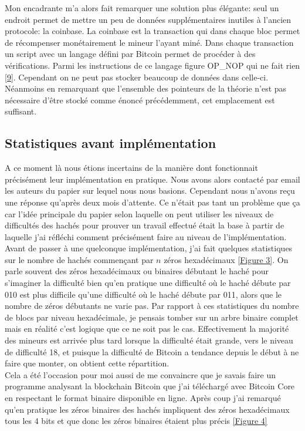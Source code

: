 \documentclass[12pt,a4paper]{article}
\newcommand{\source}[1]{\hyperlink{#1}{[#1]}}
\newcommand{\annexe}[2]{\hyperlink{#1}{[Figure #2]}}
\begin{document}
	Mon encadrante m'a alors fait remarquer une solution plus élégante: seul un endroit permet de mettre un peu de données supplémentaires inutiles à l'ancien protocole: la coinbase. La coinbase est la transaction qui dans chaque bloc permet de récompenser monétairement le mineur l'ayant miné. Dans chaque transaction un script avec un langage défini par Bitcoin permet de procéder à des vérifications. Parmi les instructions de ce langage figure OP\_NOP qui ne fait rien \source{9}. Cependant on ne peut pas stocker beaucoup de données dans celle-ci. Néanmoins en remarquant que l'ensemble des pointeurs de la théorie n'est pas nécessaire d'être stocké comme énoncé précédemment, cet emplacement est suffisant.%
	
	\subsection{Statistiques avant implémentation}%
	
	A ce moment là nous étions incertains de la manière dont fonctionnait précisément leur implémentation en pratique. Nous avons alors contacté par email les auteurs du papier sur lequel nous nous basions. Cependant nous n'avons reçu une réponse qu'après deux mois d'attente. Ce n'était pas tant un problème que ça car l'idée principale du papier selon laquelle on peut utiliser les niveaux de difficultés des hachés pour prouver un travail effectué était la base à partir de laquelle j'ai réfléchi comment précisément faire au niveau de l'implémentation. Avant de passer à une quelconque implémentation, j'ai fait quelques statistiques sur le nombre de hachés commençant par $n$ zéros hexadécimaux \annexe{23}{3}. On parle souvent des zéros hexadécimaux ou binaires débutant le haché pour s'imaginer la difficulté bien qu'en pratique une difficulté où le haché débute par 010 est plus difficile qu'une difficulté où le haché débute par 011, alors que le nombre de zéros débutants ne varie pas. Par rapport à ces statistiques du nombre de blocs par niveau hexadécimale, je pensais tomber sur un arbre binaire complet mais en réalité c'est logique que ce ne soit pas le cas. Effectivement la majorité des mineurs est arrivée plus tard lorsque la difficulté était grande, vers le niveau de difficulté 18, et puisque la difficulté de Bitcoin a tendance depuis le début à ne faire que monter, on obtient cette répartition.\\ %
Cela a été l'occasion pour moi aussi de me convaincre que je savais faire un programme analysant la blockchain Bitcoin que j'ai téléchargé avec Bitcoin Core en respectant le format binaire disponible en ligne. Après coup j'ai remarqué qu'en pratique les zéros binaires des hachés impliquent des zéros hexadécimaux tous les 4 bits et que donc les zéros binaires étaient plus précis \annexe{24}{4} %
	
\end{document}
